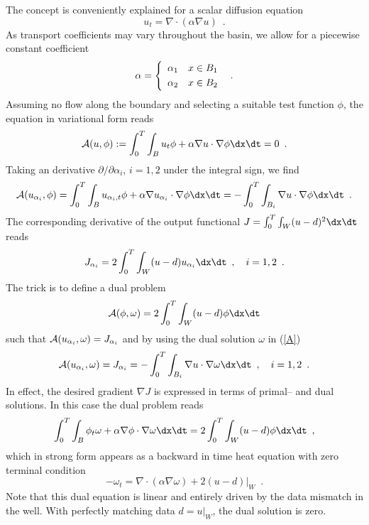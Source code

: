 The concept is conveniently explained for a scalar diffusion equation
$$
 u_t = \nabla \cdot (\alpha \nabla u) \enspace .
$$
As transport coefficients may vary throughout the basin,
we allow for a piecewise constant coefficient
$$
 \alpha = \left\{
 \begin{array}{rl} \alpha_1 & x \in B_1 \\[\jot] \alpha_2 & x \in B_2 \end{array}
 \right .
 \enspace .
$$
Assuming no flow along the boundary and
selecting a suitable test function $\phi$, the equation in variational form reads
$$
  {\cal A}(u, \phi) := \int_0^T \int_B u_t \phi + \alpha \nabla u \cdot \nabla \phi \dx \dt = 0 \enspace .
$$
Taking an derivative $\partial /\partial \alpha_i$, $i=1,2$ under the integral sign, we find
\begin{equation} \label{A}
 {\cal A}(u_{\alpha_i}, \phi) =
 \int_0^T \int_B u_{\alpha_i,t} \phi + \alpha \nabla u_{\alpha_i} \cdot \nabla \phi \dx \dt =
 - \int_0^T \int_{B_i} \nabla u \cdot \nabla \phi \dx \dt
 \enspace .
\end{equation}
The corresponding derivative of the output functional
$J=\int_0^T \int_W (u-d)^2 \dx\dt$ reads
$$
 J_{\alpha_i} = 2 \int_0^T \int_W (u - d) u_{\alpha_i} \dx\dt \enspace , \quad i=1,2 \enspace .
$$
The trick is to define a dual problem
$$
 {\cal A}(\phi, \omega) = 2 \int_0^T \int_W (u - d) \phi \dx\dt
$$
such that ${\cal A}(u_{\alpha_i}, \omega) =  J_{\alpha_i}$ and by using the dual solution $\omega$ in (\ref{A})
$$
 {\cal A}(u_{\alpha_i}, \omega) =  J_{\alpha_i} = - \int_0^T \int_{B_i} \nabla u \cdot \nabla \omega \dx \dt \enspace ,
 \quad i=1,2 \enspace .
$$
In effect, the desired gradient $\nabla J$ is expressed in terms of primal-- and dual solutions.
In this case the dual problem reads
\begin{equation} \label{dual}
 \int_0^T \int_B \phi_t \omega + \alpha \nabla \phi \cdot \nabla \omega \dx \dt =
 2 \int_0^T \int_W (u-d) \phi \dx \dt \enspace ,
\end{equation}
which in strong form appears as a backward in time heat equation with zero terminal condition
$$
 - \omega_t = \nabla \cdot (\alpha \nabla \omega) + 2 (u-d)|_W \enspace .
$$
Note that this dual equation is linear and entirely driven by the data mismatch in the well.
With perfectly matching data $d=u|_W$, the dual solution is zero.

